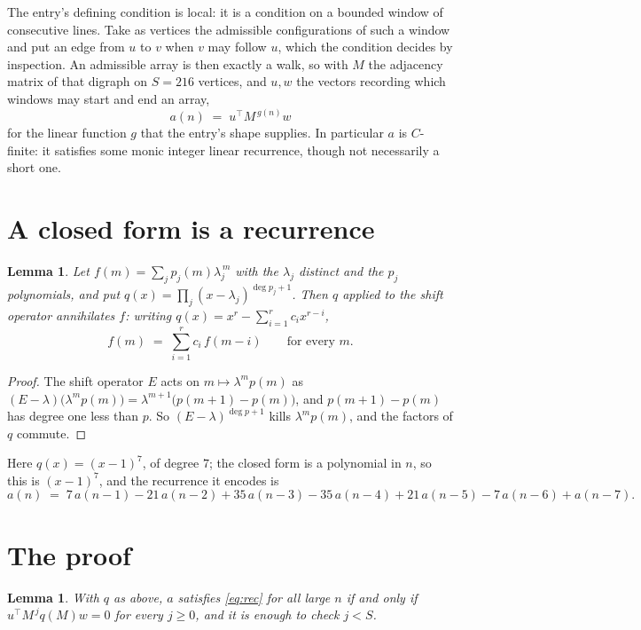 \documentclass[11pt,a4paper]{article}
\theoremstyle{plain}
\newtheorem{lemma}[theorem]{Lemma}
\theoremstyle{definition}
\begin{document}
The entry's defining condition is local: it is a condition on a bounded window of consecutive lines. Take as vertices the
admissible configurations of such a window and put an edge from $u$ to $v$ when $v$ may
follow $u$, which the condition decides by inspection. An admissible array is then exactly a
walk, so with $M$ the adjacency matrix of that digraph on $S=216$ vertices, and $u,w$ the
vectors recording which windows may start and end an array,
\[
a(n)\;=\;u^{\!\top}M^{\,g(n)}w
\]
for the linear function $g$ that the entry's shape supplies. In particular $a$ is
$C$-finite: it satisfies some monic integer linear recurrence, though not necessarily a short
one.

\section{A closed form is a recurrence}

\begin{lemma}\label{lem:ann}
Let $f(m)=\sum_{j}p_j(m)\lambda_j^{\,m}$ with the $\lambda_j$ distinct and the $p_j$
polynomials, and put $q(x)=\prod_j(x-\lambda_j)^{\deg p_j+1}$. Then $q$ applied to the shift
operator annihilates $f$: writing $q(x)=x^{r}-\sum_{i=1}^{r}c_ix^{r-i}$,
\[
f(m)\;=\;\sum_{i=1}^{r}c_i\,f(m-i)\qquad\text{for every }m.
\]
\end{lemma}

\begin{proof}
The shift operator $E$ acts on $m\mapsto\lambda^{m}p(m)$ as
$(E-\lambda)\bigl(\lambda^{m}p(m)\bigr)=\lambda^{m+1}\bigl(p(m+1)-p(m)\bigr)$, and
$p(m+1)-p(m)$ has degree one less than $p$. So $(E-\lambda)^{\deg p+1}$ kills
$\lambda^{m}p(m)$, and the factors of $q$ commute.
\end{proof}

Here $q(x)=(x-1)^{7}$, of degree $7$; the closed form is a polynomial in $n$, so this is $(x-1)^{7}$, and the recurrence it encodes is
\begin{equation}\label{eq:rec}
a(n)\;=\;7\,a(n-1) - 21\,a(n-2) + 35\,a(n-3) - 35\,a(n-4) + 21\,a(n-5) - 7\,a(n-6) + a(n-7).
\end{equation}

\section{The proof}

\begin{lemma}\label{lem:crit}
With $q$ as above, $a$ satisfies \eqref{eq:rec} for all large $n$ if and only if
$u^{\!\top}M^{\,j}q(M)w=0$ for every $j\ge0$, and it is enough to check $j<S$.
\end{lemma}
\end{document}
